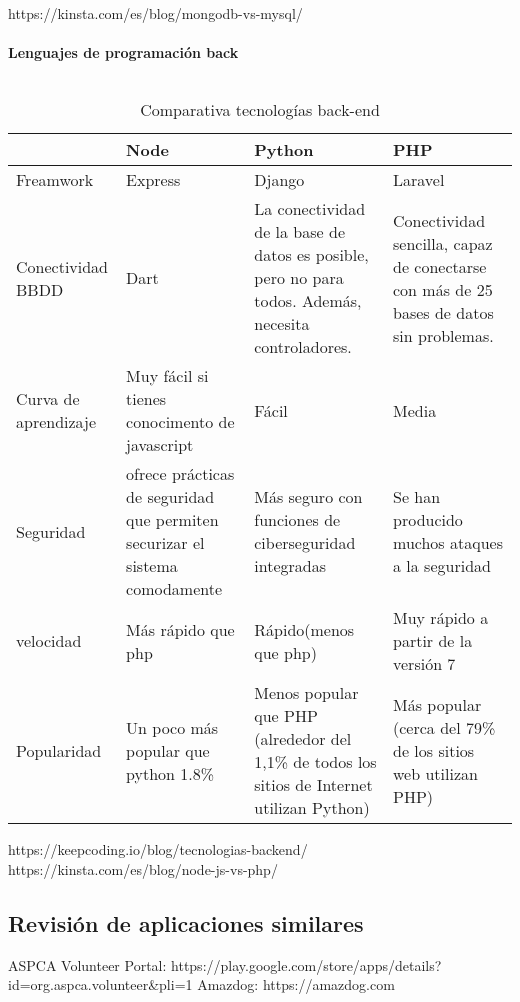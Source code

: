 https://kinsta.com/es/blog/mongodb-vs-mysql/ \\ \\

\textbf{Lenguajes de programación back} \\ \\
\begin{table}[H] %
    \centering
    \begin{tabular}{|p{2cm} |p{4 cm} |p{4cm} |p{4cm} |} \hline 
         &  \textbf{Node}&  \textbf{Python}& \textbf{PHP}\\  \hline 
         Freamwork &  Express &  Django & Laravel\\ \hline 
         
        Conectividad BBDD &  Dart&  La conectividad de la base de datos es posible, pero no para todos. Además, necesita controladores. & Conectividad sencilla, capaz de conectarse con más de 25 bases de datos sin problemas.\\ \hline 
        Curva de aprendizaje &  Muy fácil si tienes conocimento de javascript& Fácil & Media\\ \hline 
        Seguridad &  ofrece prácticas de seguridad que permiten securizar el sistema comodamente&  Más seguro con funciones de ciberseguridad integradas & Se han producido muchos ataques a la seguridad	\\ \hline 
        velocidad &  Más rápido que php &  Rápido(menos que php) & Muy rápido a partir de la versión 7\\ \hline 
        Popularidad & Un poco más popular que python 1.8\% &  Menos popular que PHP (alrededor del 1,1\% de todos los sitios de Internet utilizan Python) & Más popular (cerca del 79\% de los sitios web utilizan PHP)\\ \hline 
    \end{tabular}
    \caption{Comparativa tecnologías back-end}
    \label{tab:tec_back}
\end{table}



https://keepcoding.io/blog/tecnologias-backend/ \\
https://kinsta.com/es/blog/node-js-vs-php/


\subsection{Revisión de aplicaciones similares}

ASPCA Volunteer Portal: https://play.google.com/store/apps/details?id=org.aspca.volunteer&pli=1
Amazdog: https://amazdog.com